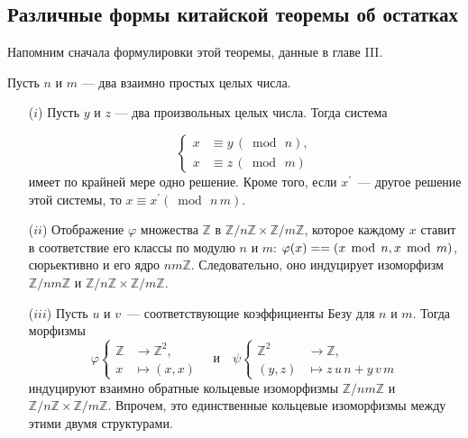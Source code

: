     \subsection{Различные формы китайской теоремы об остатках}
    \noindent Напомним сначала формулировки этой теоремы, данные в главе III.
    \begin{thm}
    \hspace*{0.5cm}
    Пусть $n$ и $m$ — два взаимно простых целых числа.
    \begin{itemize}
    \item[($i$)]Пусть $y$ и $z$ — два произвольных целых числа. Тогда система

    \[
    \left\{
    \begin{aligned}
    x &\equiv y \,(\bmod\,n),\\
    x &\equiv z \,(\bmod\,m)
    \end{aligned}
    \right.
    \]
    имеет по крайней мере одно решение. Кроме того, если $x^\prime$~— другое решение этой системы, то $x \equiv x^\prime (\bmod\,n\,m)$.

    \item[($ii$)] Отображение $\varphi$ множества $\mathbb{Z}$ в $\mathbb{Z}/n\mathbb{Z} \times \mathbb{Z}/m\mathbb{Z}$, которое каждому $x$ ставит в соответствие его классы по модулю $n$ и $m$: $\varphi (x) = \linebreak= (x\, \bmod\,n, x\,\bmod\,m)$, сюрьективно и его ядро $n m \mathbb{Z}$. Следовательно, оно индуцирует изоморфизм $\mathbb{Z}/nm\mathbb{Z}$ и $\mathbb{Z}/n\mathbb{Z} \times \mathbb{Z}/m\mathbb{Z}$.

    \item[($iii$)]Пусть $u$ и $v$~— соответствующие коэффициенты Безу для $n$ и $m$. Тогда морфизмы
    \[\varphi
    \left\{
    \begin{aligned}
    \mathbb{Z} &\to
    \mathbb{Z}^2,\\
    x &\mapsto (x, x)
    \end{aligned}
    \right. \quad \mathrm{и} \quad \psi\left\{
    \begin{aligned}
    \mathbb{Z}^2 &\to \mathbb{Z},\\
    (y, z) &\mapsto z\,u\,n + y\,v\,m
    \end{aligned}
    \right.
    \]
    индуцируют взаимно обратные кольцевые изоморфизмы $\mathbb{Z}/nm\mathbb{Z}$ и \linebreak $\mathbb{Z}/n\mathbb{Z} \times \mathbb{Z}/m\mathbb{Z}$. Впрочем, это единственные кольцевые изоморфизмы между этими двумя структурами.


\end{itemize}
\end{thm}
